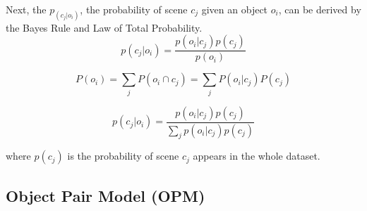 Next, the  $p_(c_{j}|o_{i})$, the probability of scene $c_{j}$ given an object $o_{i}$, can be derived by the Bayes Rule and Law of Total Probability.
\begin{equation}
p\left(c_{j} | o_{i}\right)=\frac{p\left(o_{i} | c_{j}\right) p\left(c_{j}\right)}{p(o_{i})}
\end{equation}


\begin{equation}
P(o_{i})=\sum_{j} P\left(o_{i} \cap c_{j}\right)=\sum_{j} P\left(o_{i} | c_{j}\right) P\left(c_{j}\right)
\end{equation}

\begin{equation}
p\left(c_{j} | o_{i}\right)=\frac{p\left(o_{i} | c_{j}\right) p\left(c_{j}\right)}{\sum_{j} p\left(o_{i} | c_{j}\right) p\left(c_{j}\right)}
\end{equation}

where $p(c_j)$ is the probability of scene $c_j$ appears in the whole dataset.

\subsection{\textbf{Object Pair Model (OPM)}}


